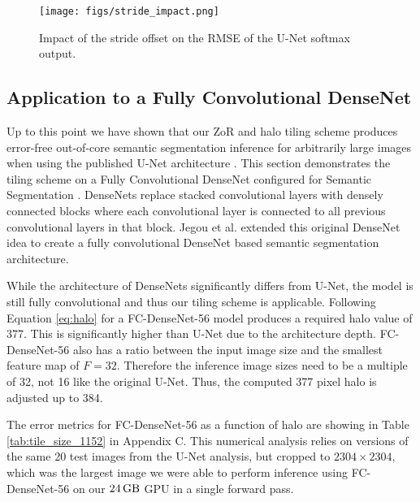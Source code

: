 \documentclass[twoside,11pt]{article}
\begin{document}
	
\begin{figure}
		\centering
		\texttt{[image: figs/stride\_impact.png]}
	\caption{Impact of the stride offset on the RMSE of the U-Net softmax output.}
	\label{fig:stride-impact}
\end{figure} 

\subsection{Application to a Fully Convolutional DenseNet}

Up to this point we have shown that our ZoR and halo tiling scheme produces error-free out-of-core semantic segmentation inference for arbitrarily large images when using the published U-Net architecture \citep{Ronneberger2015a}. 
This section demonstrates the tiling scheme on a Fully Convolutional DenseNet configured for Semantic Segmentation \citep{Jegou2017}. DenseNets \citep{Huang2017} replace stacked convolutional layers with densely connected blocks where each convolutional layer is connected to all previous convolutional layers in that block. Jegou et al. \citep{Jegou2017} extended this original DenseNet idea to create a fully convolutional DenseNet based semantic segmentation architecture. 

While the architecture of DenseNets significantly differs from U-Net, the model is still fully convolutional and thus our tiling scheme is applicable. Following Equation \ref{eq:halo} for a FC-DenseNet-56 \citep{Jegou2017} model produces a required halo value of 377. This is significantly higher than U-Net due to the architecture depth. FC-DenseNet-56 also has a ratio between the input image size and the smallest feature map of $F = 32$. Therefore the inference image sizes need to be a multiple of 32, not 16 like the original U-Net. Thus, the computed 377 pixel halo is adjusted up to 384. 

The error metrics for FC-DenseNet-56 as a function of halo are showing in Table \ref{tab:tile_size_1152} in Appendix C. This numerical analysis relies on versions of the same 20 test images from the U-Net analysis, but cropped to $\num{2304} \times \num{2304}$, which was the largest image we were able to perform inference using FC-DenseNet-56 on our $\SI{24}{\giga\byte}$ GPU in a single forward pass. 
\end{document}
